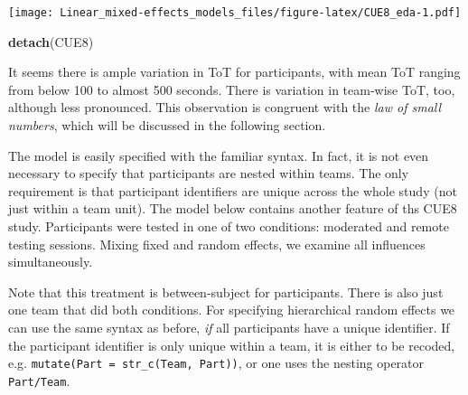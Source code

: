 \documentclass[]{svmono}
\newenvironment{Shaded}{\begin{snugshade}}{\end{snugshade}}
\newcommand{\KeywordTok}[1]{\textcolor[rgb]{0.13,0.29,0.53}{\textbf{#1}}}
\newcommand{\DataTypeTok}[1]{\textcolor[rgb]{0.13,0.29,0.53}{#1}}
\newcommand{\DecValTok}[1]{\textcolor[rgb]{0.00,0.00,0.81}{#1}}
\newcommand{\StringTok}[1]{\textcolor[rgb]{0.31,0.60,0.02}{#1}}
\newcommand{\OperatorTok}[1]{\textcolor[rgb]{0.81,0.36,0.00}{\textbf{#1}}}
\newcommand{\NormalTok}[1]{#1}
\theoremstyle{definition}
\theoremstyle{definition}
\theoremstyle{definition}
\theoremstyle{remark}
\begin{document}
\texttt{[image: Linear\_mixed-effects\_models\_files/figure-latex/CUE8\_eda-1.pdf]}

\begin{Shaded}
\begin{Highlighting}[]
\KeywordTok{detach}\NormalTok{(CUE8)}
\end{Highlighting}
\end{Shaded}

It seems there is ample variation in ToT for participants, with mean ToT
ranging from below 100 to almost 500 seconds. There is variation in
team-wise ToT, too, although less pronounced. This observation is
congruent with the \emph{law of small numbers}, which will be discussed
in the following section.

The model is easily specified with the familiar syntax. In fact, it is
not even necessary to specify that participants are nested within teams.
The only requirement is that participant identifiers are unique across
the whole study (not just within a team unit). The model below contains
another feature of ths CUE8 study. Participants were tested in one of
two conditions: moderated and remote testing sessions. Mixing fixed and
random effects, we examine all influences simultaneously.

Note that this treatment is between-subject for participants. There is
also just one team that did both conditions. For specifying hierarchical
random effects we can use the same syntax as before, \emph{if} all
participants have a unique identifier. If the participant identifier is
only unique within a team, it is either to be recoded, e.g.
\texttt{mutate(Part\ =\ str\_c(Team,\ Part))}, or one uses the nesting
operator \texttt{Part/Team}.

\begin{Shaded}
\end{Shaded}
\end{document}
